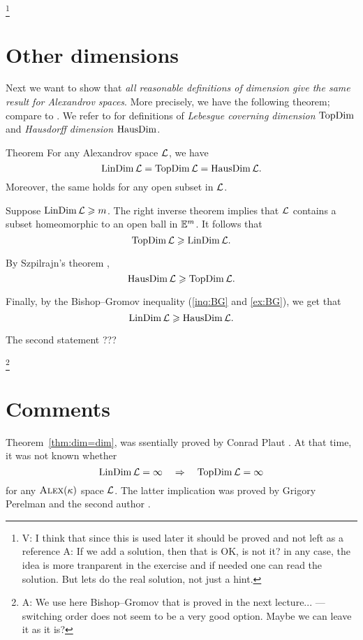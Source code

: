 \footnote{\red V: I think that since this is used later it should be proved and not left as a reference
A: If we add a solution, then that is OK, is not it? in any case, the idea is more tranparent in the exercise and if needed one can read the solution. But lets do the real solution, not just a hint.}

\section{Other dimensions}

Next we want to show that \textit{all reasonable definitions of dimension give the same result for Alexandrov spaces}.
More precisely, we have the following theorem; compare to \cite[15.16]{alexander-kapovitch-petrunin2024}.
We refer to \cite{hurewicz-wallman} for definitions of \emph{Lebesgue coverning dimension} $\mathop{\rm TopDim}\nolimits$ and \emph{Hausdorff dimension} $\mathop{\rm HausDim}\nolimits$.

\begin{thm}{Theorem}\label{thm:dim=dim}
For any Alexandrov space $\mathcal{L}$, we have
\[\mathop{\rm LinDim}\nolimits \mathcal{L}=\mathop{\rm TopDim}\nolimits \mathcal{L}=\mathop{\rm HausDim}\nolimits \mathcal{L}.\]
Moreover, the same holds for any open subset in $\mathcal{L}$.
\end{thm}

Suppose $\mathop{\rm LinDim}\nolimits\mathcal{L}\geqslant m$.
The right inverse theorem implies that $\mathcal{L}$ contains a subset homeomorphic to an open ball in $\mathbb{E}^m$.
It follows that
\[\mathop{\rm TopDim}\nolimits\mathcal{L}\geqslant \mathop{\rm LinDim}\nolimits\mathcal{L}.\]

By Szpilrajn's theorem \cite[theorems V 8 and VII 2]{hurewicz-wallman}, 
\[\mathop{\rm HausDim}\nolimits\mathcal{L}\geqslant\mathop{\rm TopDim}\nolimits\mathcal{L}.\]

Finally, by the Bishop--Gromov inequality (\ref{inq:BG} and \ref{ex:BG}), we get that 
\[\mathop{\rm LinDim}\nolimits \mathcal{L}\geqslant \mathop{\rm HausDim}\nolimits\mathcal{L}.\]

The second statement ???
\qeds

\footnote{\red A: We use here Bishop--Gromov that is proved in the next lecture... --- switching order does not seem to be a very good option. Maybe we can leave it as it is?}

\section{Comments}

Theorem~\ref{thm:dim=dim}, was ssentially proved by Conrad Plaut \cite{plaut:dimension}.
At that time, it was not known whether
\[\mathop{\rm LinDim}\nolimits\mathcal{L}=\infty\quad \Rightarrow\quad \mathop{\rm TopDim}\nolimits\mathcal{L}=\infty\]
for any $\textsc{Alex}(\kappa)$ space $\mathcal{L}$.
The latter implication was proved by Grigory Perelman and the second author \cite{perelman-petrunin:qg}.

